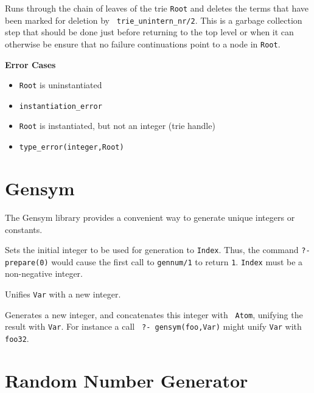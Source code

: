 \begin{description}
Runs through the chain of leaves of the trie {\tt Root} and deletes
the terms that have been marked for deletion by {\tt
  trie\_unintern\_nr/2}. This is a garbage collection step that should
be done just before returning to the top level or when it can
otherwise be ensure that no failure continuations point to a node in
{\tt Root}.

{\bf Error Cases}
\begin{itemize}
\item 	{\tt Root} is uninstantiated
\bi
\item 	 {\tt instantiation\_error}
\ei
\item 	{\tt Root} is instantiated, but not an integer (trie handle)
\bi
\item 	 {\tt type\_error(integer,Root)}
\ei
\end{itemize}


\end{description}

\section{Gensym}

The Gensym library provides a convenient way to generate unique
integers or constants.  

\begin{description}
 
%
Sets the initial integer to be used for generation to {\tt Index}.
Thus, the command {\tt ?- prepare(0)} would cause the first call to
{\tt gennum/1} to return {\tt 1}.  {\tt Index} must be a non-negative
integer.

 
%
Unifies {\tt Var} with a new integer.

 
%
Generates a new integer, and concatenates this integer with {\tt
Atom}, unifying the result with {\tt Var}.  For instance a call {\tt
?- gensym(foo,Var)} might unify {\tt Var} with {\tt foo32}.
\end{description}

\section{Random Number Generator}

